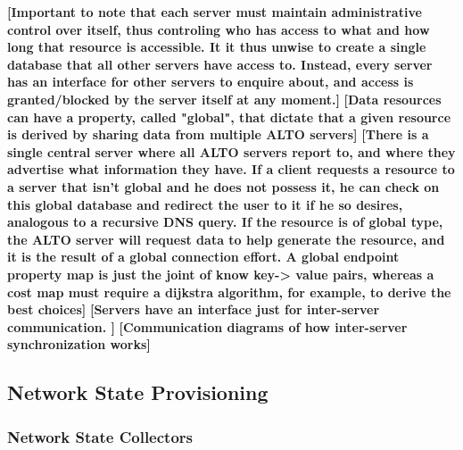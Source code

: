     \textbf{[Important to note that each server must maintain administrative control over itself, thus controling who has access to what and how long that resource is accessible. It it thus unwise to create a single database that all other servers have access to. Instead, every server has an interface for other servers to enquire about, and access is granted/blocked by the server itself at any moment.]}
    \textbf{[Data resources can have a property, called "global", that dictate that a given resource is derived by sharing data from multiple ALTO servers]}
    \textbf{[There is a single central server where all ALTO servers report to, and where they advertise what information they have. If a client requests a resource to a server that isn't global and he does not possess it, he can check on this global database and redirect the user to it if he so desires, analogous to a recursive DNS query. If the resource is of global type, the ALTO server will request data to help generate the resource, and it is the result of a global connection effort. A global endpoint property map is just the joint of know key-> value pairs, whereas a cost map must require a dijkstra algorithm, for example, to derive the best choices]}
    \textbf{[Servers have an interface just for inter-server communication. ]}
    \textbf{[Communication diagrams of how inter-server synchronization works]}

\subsection{Network State Provisioning}

\subsubsection{Network State Collectors}

